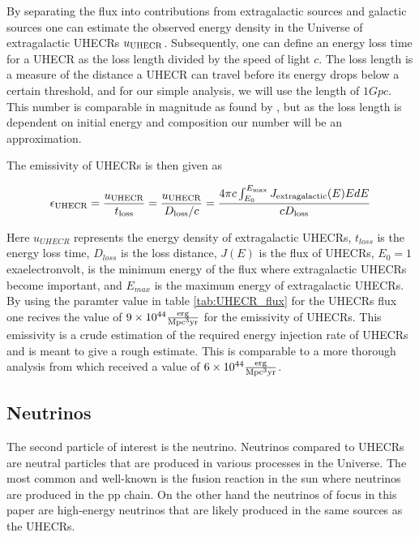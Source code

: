 By separating the flux into contributions from extragalactic sources and galactic sources one can estimate the observed energy density in the Universe of extragalactic UHECRs $u_{\rm UHECR}$. Subsequently, one can define an energy loss time for a UHECR as the loss length divided by the speed of light $c$.
The loss length is a measure of the distance a UHECR can travel before its energy drops below a certain threshold, and for our simple analysis, we will use the length of $1 Gpc$. This number is comparable in magnitude as found by \cite{Stanev_2009}, but as the loss length is dependent on initial energy and composition our number will be an approximation.

The emissivity of UHECRs is then given as

\begin{equation}
    \epsilon_{\rm UHECR} = \frac{u_{\rm UHECR}}{t_{\rm loss}} = \frac{u_{\rm UHECR}}{D_{\rm loss}/c} = \frac{4\pi c \int_{E_0}^{E_{\rm max}}J_{\rm extragalactic}(E)E dE}{c D_{\rm loss}} %
\end{equation}

Here $u_{UHECR}$ represents the energy density of extragalactic UHECRs, $t_{loss}$ is the energy loss time, $D_{loss}$ is the loss distance, $J(E)$ is the flux of UHECRs, $E_0 = 1$ exaelectronvolt, is the minimum energy of the flux where extragalactic UHECRs become important, and $E_{max}$ is the maximum energy of extragalactic UHECRs.
By using the paramter value in table \ref{tab:UHECR_flux} for the UHECRs flux one recives the value of $9 \times  10^{44} \frac{\rm erg}{\rm Mpc^3 \rm yr}$ for the emissivity of UHECRs.
This emissivity is a crude estimation of the required energy injection rate of UHECRs and is meant to give a rough estimate. This is comparable to a more thorough analysis from \cite{PhysRevLett.125.121106} which received a value of $6 \times 10^{44} \frac{\rm erg}{\rm Mpc^3 \rm yr}$.




\subsection{Neutrinos}

The second particle of interest is the neutrino. Neutrinos compared to UHECRs are neutral particles that are produced in various processes in the Universe.
The most common and well-known is the fusion reaction in the sun where neutrinos are produced in the pp chain. On the other hand the neutrinos of focus in this paper 
are high-energy neutrinos that are likely produced in the same sources as the UHECRs.



